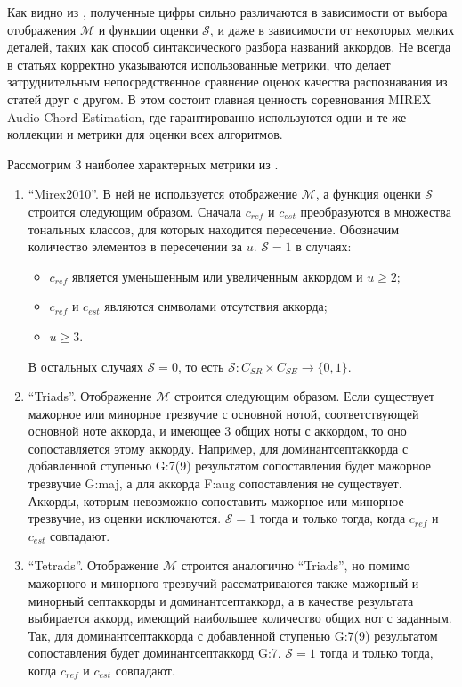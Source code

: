 Как видно из \cite{Pauwels2013}, полученные цифры сильно различаются в
зависимости от выбора отображения $\mathcal{M}$ и функции оценки $\mathcal{S}$,
и даже в зависимости от некоторых мелких деталей, таких как способ
синтаксического разбора названий аккордов. Не всегда в статьях корректно
указываются использованные метрики, что делает затруднительным непосредственное
сравнение оценок качества распознавания из статей друг с другом. В этом состоит
главная ценность соревнования MIREX Audio Chord Estimation, где гарантированно
используются одни и те же коллекции и метрики для оценки всех алгоритмов.

Рассмотрим 3 наиболее характерных метрики из \cite{Pauwels2013}.

\begin{enumerate}
  \item ``Mirex2010''. В ней не используется отображение $\mathcal{M}$, а
  функция оценки $\mathcal{S}$ строится следующим образом. Сначала $c_{ref}$ и
  $c_{est}$ преобразуются в множества тональных классов, для которых находится
  пересечение. Обозначим количество элементов в пересечении за $u$.
  $\mathcal{S}=1$ в случаях:
  \begin{itemize}
    \item $c_{ref}$ является уменьшенным или увеличенным аккордом и $u \geq 2$;
    \item $c_{ref}$ и $c_{est}$ являются символами отсутствия аккорда;
    \item $u \geq 3$.
  \end{itemize}
  В остальных случаях $\mathcal{S}=0$, то есть $\mathcal{S}:C_{SR} \times C_{SE}
  \to \{0, 1\}$. 
  \item ``Triads''. Отображение $\mathcal{M}$ строится следующим образом. Если
  существует мажорное или минорное трезвучие с основной нотой, соответствующей
  основной ноте аккорда, и имеющее 3 общих ноты с аккордом, то оно
  сопоставляется этому аккорду. Например, для доминантсептаккорда с добавленной
  ступенью G:7(9) результатом сопоставления будет мажорное трезвучие G:maj, а
  для аккорда F:aug сопоставления не существует. Аккорды, которым невозможно
  сопоставить мажорное или минорное трезвучие, из оценки исключаются.
  $\mathcal{S}=1$ тогда и только тогда, когда $c_{ref}$ и $c_{est}$ совпадают.
  \item ``Tetrads''. Отображение $\mathcal{M}$ строится аналогично ``Triads'',
  но помимо мажорного и минорного трезвучий рассматриваются также мажорный и
  минорный септаккорды и доминантсептаккорд, а в качестве результата выбирается
  аккорд, имеющий наибольшее количество общих нот с заданным. Так, для
  доминантсептаккорда с добавленной ступенью G:7(9) результатом сопоставления
  будет доминантсептаккорд G:7. $\mathcal{S}=1$ тогда и только тогда, когда
  $c_{ref}$ и $c_{est}$ совпадают.
\end{enumerate}

